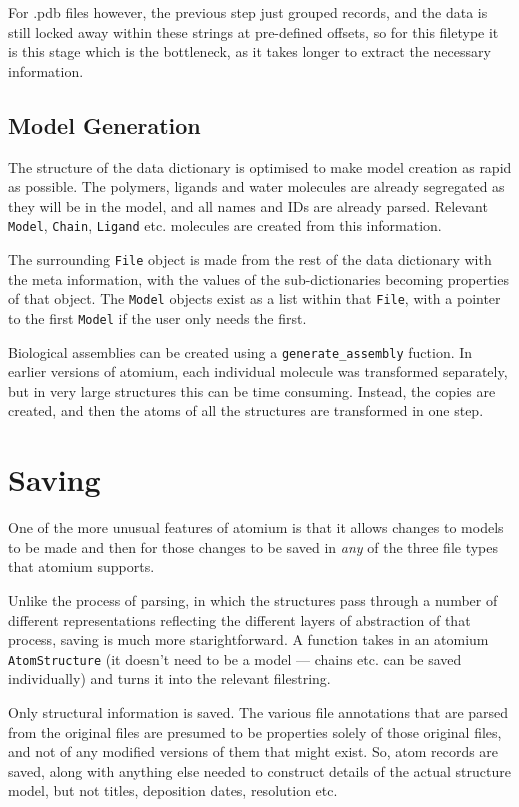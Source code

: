 For .pdb files however, the previous step just grouped records, and the data is still locked away within these strings at pre-defined offsets, so for this filetype it is this stage which is the bottleneck, as it takes longer to extract the necessary information.

\subsection{Model Generation}

The structure of the data dictionary is optimised to make model creation as rapid as possible. The polymers, ligands and water molecules are already segregated as they will be in the model, and all names and IDs are already parsed. Relevant \texttt{Model}, \texttt{Chain}, \texttt{Ligand} etc. molecules are created from this information.

The surrounding \texttt{File} object is made from the rest of the data dictionary with the meta information, with the values of the sub-dictionaries becoming properties of that object. The \texttt{Model} objects exist as a list within that \texttt{File}, with a pointer to the first \texttt{Model} if the user only needs the first.

Biological assemblies can be created using a \texttt{generate\_assembly} fuction. In earlier versions of atomium, each individual molecule was transformed separately, but in very large structures this can be time consuming. Instead, the copies are created, and then the atoms of all the structures are transformed in one step.

\section{Saving}

One of the more unusual features of atomium is that it allows changes to models to be made and then for those changes to be saved in \emph{any} of the three file types that atomium supports.

Unlike the process of parsing, in which the structures pass through a number of different representations reflecting the different layers of abstraction of that process, saving is much more starightforward. A function takes in an atomium \texttt{AtomStructure} (it doesn't need to be a model --- chains etc. can be saved individually) and turns it into the relevant filestring.

Only structural information is saved. The various file annotations that are parsed from the original files are presumed to be properties solely of those original files, and not of any modified versions of them that might exist. So, atom records are saved, along with anything else needed to construct details of the actual structure model, but not titles, deposition dates, resolution etc.

